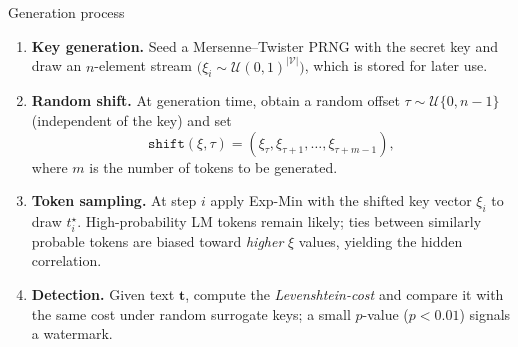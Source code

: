 \begin{frame}{Generation process}
    \begin{enumerate}
        \item \textbf{Key generation.}\;
              Seed a Mersenne–Twister PRNG with the secret key and draw an
              \(n\)-element stream
              \(\bigl(\xi_i\sim\mathcal U(0,1)^{|\mathcal V|}\bigr)\),
              which is stored for later use.
        \item \textbf{Random shift.}\;
              At generation time, obtain a random offset
              \(\tau\sim\mathcal U\{0,n-1\}\) (independent of the key) and
              set
              \[
                  \texttt{shift}(\xi,\tau)=
                  (\xi_\tau,\xi_{\tau+1},\dots,\xi_{\tau+m-1}),
              \]
              where \(m\) is the number of tokens to be generated.
        \item \textbf{Token sampling.}\;
              At step \(i\) apply Exp-Min with the shifted key vector
              \(\xi_i\) to draw \(t_i^\star\).
              High-probability LM tokens remain likely; ties between
              similarly probable tokens are biased toward
              \emph{higher} \(\xi\) values, yielding the hidden correlation.
        \item \textbf{Detection.}\;
              Given text \(\mathbf t\), compute the \emph{Levenshtein-cost} and compare it with
              the same cost under random surrogate keys; a small \(p\)-value
              (\(p<0.01\)) signals a watermark.
    \end{enumerate}
\end{frame}

